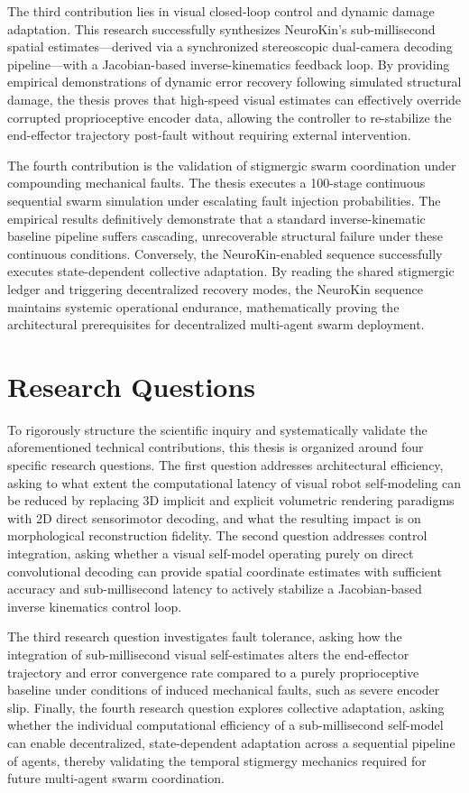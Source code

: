 \documentclass[12pt,a4paper,oneside]{report}
\begin{document}
The third contribution lies in visual closed-loop control and dynamic damage adaptation. This research successfully synthesizes NeuroKin's sub-millisecond spatial estimates—derived via a synchronized stereoscopic dual-camera decoding pipeline—with a Jacobian-based inverse-kinematics feedback loop. By providing empirical demonstrations of dynamic error recovery following simulated structural damage, the thesis proves that high-speed visual estimates can effectively override corrupted proprioceptive encoder data, allowing the controller to re-stabilize the end-effector trajectory post-fault without requiring external intervention.

The fourth contribution is the validation of stigmergic swarm coordination under compounding mechanical faults. The thesis executes a 100-stage continuous sequential swarm simulation under escalating fault injection probabilities. The empirical results definitively demonstrate that a standard inverse-kinematic baseline pipeline suffers cascading, unrecoverable structural failure under these continuous conditions. Conversely, the NeuroKin-enabled sequence successfully executes state-dependent collective adaptation. By reading the shared stigmergic ledger and triggering decentralized recovery modes, the NeuroKin sequence maintains systemic operational endurance, mathematically proving the architectural prerequisites for decentralized multi-agent swarm deployment.

\section{Research Questions}

To rigorously structure the scientific inquiry and systematically validate the aforementioned technical contributions, this thesis is organized around four specific research questions. The first question addresses architectural efficiency, asking to what extent the computational latency of visual robot self-modeling can be reduced by replacing 3D implicit and explicit volumetric rendering paradigms with 2D direct sensorimotor decoding, and what the resulting impact is on morphological reconstruction fidelity. The second question addresses control integration, asking whether a visual self-model operating purely on direct convolutional decoding can provide spatial coordinate estimates with sufficient accuracy and sub-millisecond latency to actively stabilize a Jacobian-based inverse kinematics control loop. 

The third research question investigates fault tolerance, asking how the integration of sub-millisecond visual self-estimates alters the end-effector trajectory and error convergence rate compared to a purely proprioceptive baseline under conditions of induced mechanical faults, such as severe encoder slip. Finally, the fourth research question explores collective adaptation, asking whether the individual computational efficiency of a sub-millisecond self-model can enable decentralized, state-dependent adaptation across a sequential pipeline of agents, thereby validating the temporal stigmergy mechanics required for future multi-agent swarm coordination.
\end{document}
